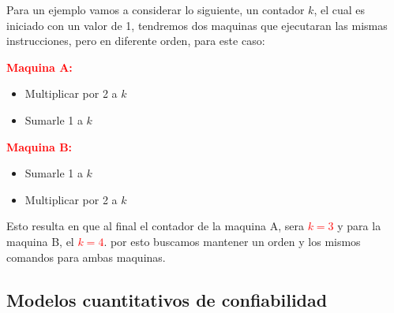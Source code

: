 Para un ejemplo vamos a considerar lo siguiente, un contador $k$, el cual es iniciado con un valor de 1, tendremos dos maquinas que ejecutaran las mismas instrucciones, pero en diferente orden, para este caso:

\textcolor{red}{\textbf{Maquina A:}}
\begin{itemize}
    \item Multiplicar por 2 a $k$
    \item Sumarle 1 a $k$
\end{itemize}
\textcolor{red}{\textbf{Maquina B:}}
\begin{itemize}
    \item Sumarle 1 a $k$
    \item Multiplicar por 2 a $k$
\end{itemize}
\vspace{1mm}

Esto resulta en que al final el contador de la maquina A, sera \textcolor{red}{$k=3$} y para la maquina B, el \textcolor{red}{$k=4$}. por esto buscamos mantener un orden y los mismos comandos para ambas maquinas.

\subsection{Modelos cuantitativos de confiabilidad}










